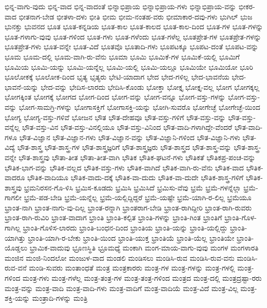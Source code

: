 {ಭಿನ್ನ-ವಾಗು-ವುದು
ಭಿನ್ನ-ವಾದ
ಭಿನ್ನ-ವಾದಂತೆ
ಭಿನ್ನಾಭಿಪ್ರಾಯ
ಭಿನ್ನಾಭಿಪ್ರಾಯ-ಗಳು
ಭಿನ್ನಾಭಿಪ್ರಾಯ-ವನ್ನು
ಭೀಕರ-ವಾದ
ಭೀತನಾಗ-ಬೇಡ
ಭೀತಳಾ-ದಳು
ಭೀತಿ
ಭೀಮ
ಭೀಮ-ನಂತಹ-ವರು
ಭೀಮಾಕಾರ-ದವು-ಗಳು
ಭುಗಿಲ್
ಭುಜ
ಭುನಕ್ತು
ಭುವನದ
ಭೂತ
ಭೂತ-ಕನ್ನಡಿಯ
ಭೂತ-ಕಾಲ
ಭೂತ-ಕಾಲದ
ಭೂತ-ಕಾಲ-ದಿಂದ
ಭೂತ-ಗಳ
ಭೂತ-ಗಳನ್ನು
ಭೂತ-ಗಳಾಗು-ವುವು
ಭೂತ-ಗಳಿಂದ
ಭೂತ-ಗಳು
ಭೂತ-ಗಳೆಂದು
ಭೂತ-ಗಳೆಲ್ಲ
ಭೂತಪ್ರೇತ-ಗಳ
ಭೂತಪ್ರೇತ-ಗಳನ್ನು
ಭೂತಪ್ರೇತ-ಗಳು
ಭೂತ-ವನ್ನೇ
ಭೂತ-ವಿದೆ
ಭೂತವೊ
ಭೂತಾದಿ-ಗಳು
ಭೂಪಟಕ್ಕೂ
ಭೂಪಟ-ದಂತೆ
ಭೂಪಟ-ವನ್ನು
ಭೂಮ
ಭೂಮ-ದಲ್ಲಿ
ಭೂಮ-ವಾಗಿ-ರು-ವೆನು
ಭೂಮಾ
ಭೂಮಿ
ಭೂಮಿಕೆ-ಗಳ
ಭೂಮಿಕೆ-ಯಲ್ಲಿ
ಭೂಮಿಗೆ
ಭೂಮಿಯ
ಭೂಮಿ-ಯನ್ನು
ಭೂಮಿ-ಯನ್ನೆಲ್ಲ
ಭೂಮಿ-ಯಲ್ಲಿ
ಭೂಮಿ-ಯಲ್ಲೂ
ಭೂಮಿಯೇ
ಭೂಮಿಯೋ
ಭೂರಿ
ಭೂಲೋಕಕ್ಕೆ
ಭೂಲೋಕ-ದಿಂದ
ಭೃತ್ಯ
ಭೃತ್ಯರು
ಭೇಟಿ-ಯಾದಾಗ
ಭೇದ
ಭೇದ-ಗಳಿಲ್ಲ
ಭೇದ-ಭಾವನೆಯ
ಭೇದ-ಭಾವನೆ-ಯನ್ನು
ಭೇದ-ವನ್ನು
ಭೇದಿಸ-ಲಾರದು
ಭೇದಿಸಿ-ಕೊಂಡು
ಭೋಕ್ತಾ
ಭೋಕ್ತೃ
ಭೋಕ್ತೃ-ವಲ್ಲ
ಭೋಗ
ಭೋಗಕ್ಕಲ್ಲ
ಭೋಗಕ್ಕಿಂತ
ಭೋಗಕ್ಕೆ
ಭೋಗದ
ಭೋಗ-ದಿಂದ
ಭೋಗ-ವನ್ನು
ಭೋಗ-ವನ್ನೂ
ಭೋಗ-ವಸ್ತು-ಗಳನ್ನು
ಭೋಗ-ವಸ್ತು-ವನ್ನು
ಭೋಗ-ಸಾಮಗ್ರಿ-ಗಳನ್ನು
ಭೋಗಾಸಕ್ತಿಗೆ
ಭೋಗಾಸಕ್ತಿ-ಯನ್ನು
ಭೋಗಿ-ಸುವರೊ
ಭೋಗೇಚ್ಛೆ
ಭೋಗೇಚ್ಛೆ-ಯಿಂದ
ಭೋಗ್ಯ
ಭೋಗ್ಯ-ವಸ್ತು-ಗಳಿವೆ
ಭೋಜನ
ಭೌತ
ಭೌತ-ದೇಹವೂ
ಭೌತ-ವಸ್ತು-ಗಳಿಗೆ
ಭೌತ-ವಸ್ತು-ವನ್ನು
ಭೌತ-ವಸ್ತು-ವನ್ನೆಲ್ಲ
ಭೌತ-ವಸ್ತು-ವಿನ
ಭೌತ-ವಸ್ತು-ವಿನಲ್ಲಿಯೂ
ಭೌತ-ವಸ್ತು-ವಿನಿಂದ
ಭೌತ-ವಾದಿ-ಗಳಾಗಿದ್ದೇ-ವೆಂದರೆ
ಭೌತ-ವಾದಿ-ಗಳೂ
ಭೌತ-ವಿಜ್ಞಾನ
ಭೌತ-ವಿಜ್ಞಾನ-ಗಳು
ಭೌತ-ವಿಜ್ಞಾನ-ವನ್ನು
ಭೌತ-ವಿಜ್ಞಾನಿ-ಗಳಿಂದ
ಭೌತ-ವಿಜ್ಞಾನಿ-ಗಳು
ಭೌತ-ವಿದ್ಯೆ
ಭೌತ-ಶಾಸ್ತ್ರ
ಭೌತ-ಶಾಸ್ತ್ರ-ಗಳ
ಭೌತ-ಶಾಸ್ತ್ರಜ್ಞರಿಗೆ
ಭೌತ-ಶಾಸ್ತ್ರಜ್ಞರು
ಭೌತ-ಶಾಸ್ತ್ರದ
ಭೌತ-ಶಾಸ್ತ್ರ-ವನ್ನು
ಭೌತ-ಶಾಸ್ತ್ರ-ವನ್ನೇ
ಭೌತ-ಶಾಸ್ತ್ರವು
ಭೌತಾ-ತೀತ
ಭೌತಾ-ತೀತ-ವಾಗಿ
ಭೌತಿಕ
ಭೌತಿಕ-ಘಟನೆ-ಗಳು
ಭೌತಿಕತೆ
ಭೌತಿಕಪ್ರ-ಪಂಚ-ವನ್ನು
ಭೌತಿಕ-ಭಾಗ-ವನ್ನು
ಭೌತಿಕ-ವಲ್ಲದ
ಭೌತಿಕ-ವಸ್ತು-ಗಳು
ಭೌತಿಕ-ವಾಗಿದೆ
ಭೌತಿಕ-ವಾಗಿ-ರು-ವೆನು
ಭೌತಿಕ-ವಾದ
ಭೌತಿಕ-ವಾದರೂ
ಭೌತಿಕ-ವಾದಿಯೂ
ಭೌತಿಕ-ವಾದು-ದಕ್ಕೆ
ಭೌತಿಕ-ವಾ-ದುದು
ಭೌತಿಕ-ವಾ-ದುದೇ
ಭೌತಿಕ-ಶಾಸ್ತ್ರ-ಗಳಿಗೆ
ಭೌತಿಕ-ಶಾಸ್ತ್ರವು
ಭ್ರಮನಿರಸನ-ಗೊ-ಳಿಸಿ
ಭ್ರಮಿಸ-ಕೂಡದು
ಭ್ರಮಿಸಿ
ಭ್ರಮಿಸಿದೆ
ಭ್ರಮಿಸು-ವೆವು
ಭ್ರಮೆ
ಭ್ರಮೆ-ಗಳನ್ನೆಲ್ಲಾ
ಭ್ರಮೆ-ಗಾಗಲೀ
ಭ್ರಮೆ-ಪಡ-ಬೇಡಿ
ಭ್ರಮೆ-ಯನ್ನೆಲ್ಲ
ಭ್ರಮೆ-ಯಲ್ಲಿದ್ದಿದ್ದರೆ
ಭ್ರಮೆ-ಯಷ್ಟೇ
ಭ್ರಮೆ-ಯಾಗಿ-ರ-ಲಿಲ್ಲ
ಭ್ರಮೆಯೂ
ಭ್ರಾಂತ-ನಾಗಿ
ಭ್ರಾಂತ-ನಾಗು-ವು-ದಿಲ್ಲ
ಭ್ರಾಂತ-ರನ್ನಾಗಿ
ಭ್ರಾಂತರಾಗ-ಬೇಡಿ
ಭ್ರಾಂತ-ರಾಗಿದ್ದೀರಿ
ಭ್ರಾಂತ-ರಾಗಿ-ರುವರು
ಭ್ರಾಂತ-ರಾಗಿ-ರುವಿರಿ
ಭ್ರಾಂತ-ವಾದಾಗ
ಭ್ರಾಂತಿ
ಭ್ರಾಂತಿ-ಕಲ್ಪಿತ
ಭ್ರಾಂತಿ-ಗಳನ್ನು
ಭ್ರಾಂತಿ-ಗಿಂತ
ಭ್ರಾಂತಿಗೆ
ಭ್ರಾಂತಿ-ಗೊಳ-ಗಾಗಿಲ್ಲ
ಭ್ರಾಂತಿ-ಗೊಳಿಸ-ಲಾರದು
ಭ್ರಾಂತಿ-ಬಂಧನ-ದಿಂದ
ಭ್ರಾಂತಿಯ
ಭ್ರಾಂತಿ-ಯನ್ನು
ಭ್ರಾಂತಿ-ಯಲ್ಲಿದ್ದು
ಭ್ರಾಂತಿ-ಯಾಗಿತ್ತು
ಭ್ರಾಂತಿ-ಯಾಗಿ-ರ-ಬೇಕು
ಭ್ರಾಂತಿ-ಯಿಂದ
ಭ್ರಾಂತಿ-ಯುಕ್ತ
ಭ್ರಾಂತಿಯೆ
ಭ್ರಾಂತಿ-ಯೆಲ್ಲ
ಭ್ರಾಂತಿಯೇ
ಭ್ರಾಂತಿ-ಯೊಡ್ಡಲು
ಭ್ರಾಮಿಕ-ವಾದುವು
ಭ್ರೂಣಸ್ಥಿತಿ
ಭ್ರೂಮಧ್ಯೆ
ಮಂಕಾಗಿ
ಮಂಗ-ಮಾಯ-ವಾಗು-ವುವು
ಮಂಗಳ
ಮಂಗಳಾರತಿ
ಮಂಜಿನ
ಮಂಜಿ-ನಿಂದಲೋ
ಮಂಜುಳ-ವಾದ
ಮಂಡಲಿ
ಮಂಡಿಸಲು
ಮಂಡಿಸಿ-ರುವ
ಮಂಡಿಸಿ-ರುವ-ವನು
ಮಂಡಿಸಿ-ರುವ-ವನೆ
ಮಂಡಿ-ಸುವರು
ಮಂತಾಂಧತೆ
ಮಂತ್ರ
ಮಂತ್ರಕಾರರು
ಮಂತ್ರ-ಗಳ
ಮಂತ್ರ-ಗಳನ್ನು
ಮಂತ್ರ-ಗಳಲ್ಲಿ
ಮಂತ್ರ-ಗಳಿಂದ
ಮಂತ್ರ-ಗಳು
ಮಂತ್ರ-ಗಳೆಲ್ಲ
ಮಂತ್ರ-ತಂತ್ರ-ಗಳ
ಮಂತ್ರ-ತಂತ್ರ-ಗಳಿಂದ
ಮಂತ್ರದ
ಮಂತ್ರ-ದಲ್ಲಿ
ಮಂತ್ರದ್ರಷ್ಟಾ-ರರು
ಮಂತ್ರ-ವನ್ನು
ಮಂತ್ರ-ವಾದಿ
ಮಂತ್ರ-ವಾದಿ-ಗಳು
ಮಂತ್ರ-ವಾದಿಗೆ
ಮಂತ್ರ-ವಾದಿಯೆ
ಮಂತ್ರ-ವಿದೆ
ಮಂತ್ರ-ವಿಲ್ಲ
ಮಂತ್ರ-ಶಕ್ತಿ-ಯನ್ನು
ಮಂತ್ರಾದಿ-ಗಳನ್ನು
ಮಂತ್ರಿ
}
